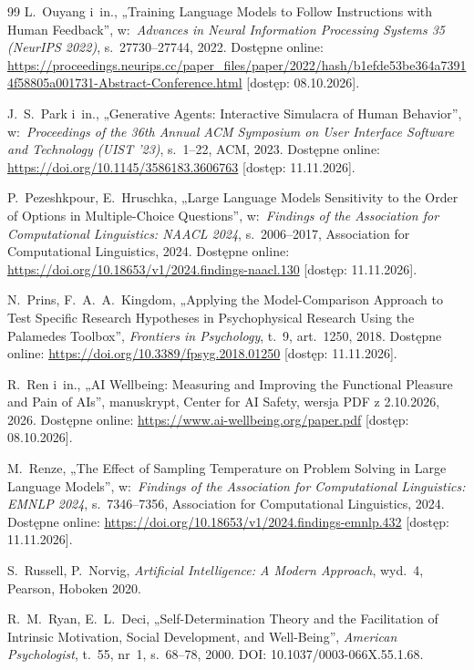 \begin{thebibliography}{99}
 L.~Ouyang i~in., „Training Language Models to Follow Instructions with Human Feedback”, w:~\textit{Advances in Neural Information Processing Systems 35 (NeurIPS 2022)}, s.~27730--27744, 2022. Dostępne online: \url{https://proceedings.neurips.cc/paper_files/paper/2022/hash/b1efde53be364a73914f58805a001731-Abstract-Conference.html} [dostęp: 08.10.2026].

 J.~S.~Park i~in., „Generative Agents: Interactive Simulacra of Human Behavior”, w:~\textit{Proceedings of the 36th Annual ACM Symposium on User Interface Software and Technology (UIST '23)}, s.~1--22, ACM, 2023. Dostępne online: \url{https://doi.org/10.1145/3586183.3606763} [dostęp: 11.11.2026].

 P.~Pezeshkpour, E.~Hruschka, „Large Language Models Sensitivity to the Order of Options in Multiple-Choice Questions”, w:~\textit{Findings of the Association for Computational Linguistics: NAACL 2024}, s.~2006--2017, Association for Computational Linguistics, 2024. Dostępne online: \url{https://doi.org/10.18653/v1/2024.findings-naacl.130} [dostęp: 11.11.2026].

 N.~Prins, F.~A.~A.~Kingdom, „Applying the Model-Comparison Approach to Test Specific Research Hypotheses in Psychophysical Research Using the Palamedes Toolbox”, \textit{Frontiers in Psychology}, t.~9, art.~1250, 2018. Dostępne online: \url{https://doi.org/10.3389/fpsyg.2018.01250} [dostęp: 11.11.2026].

 R.~Ren i~in., „{AI} Wellbeing: Measuring and Improving the Functional Pleasure and Pain of {AIs}”, manuskrypt, Center for AI Safety, wersja PDF z 2.10.2026, 2026. Dostępne online: \url{https://www.ai-wellbeing.org/paper.pdf} [dostęp: 08.10.2026].

 M.~Renze, „The Effect of Sampling Temperature on Problem Solving in Large Language Models”, w:~\textit{Findings of the Association for Computational Linguistics: EMNLP 2024}, s.~7346--7356, Association for Computational Linguistics, 2024. Dostępne online: \url{https://doi.org/10.18653/v1/2024.findings-emnlp.432} [dostęp: 11.11.2026].

 S.~Russell, P.~Norvig, \textit{Artificial Intelligence: A Modern Approach}, wyd.~4, Pearson, Hoboken 2020.

 R.~M.~Ryan, E.~L.~Deci, „Self-Determination Theory and the Facilitation of Intrinsic Motivation, Social Development, and Well-Being”, \textit{American Psychologist}, t.~55, nr~1, s.~68--78, 2000. DOI: 10.1037/0003-066X.55.1.68.


\end{thebibliography}
